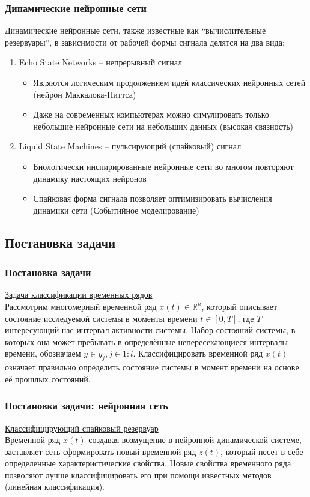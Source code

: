 \documentclass{beamer}
\begin{document}
\begin{frame}
\frametitle{Динамические нейронные сети}
Динамические нейронные сети, также известные как ``вычислительные резервуары'', в зависимости от рабочей формы сигнала делятся на два вида:
\begin{enumerate}
\item Echo State Networks \cite{jaeger} -- непрерывный сигнал\\
\begin{itemize}

\item Являются логическим продолжением идей классических нейронных сетей (нейрон Маккалока-Питтса)
\item Даже на современных компьютерах можно симулировать только небольшие нейронные сети на небольших данных (высокая связность)

\end{itemize}
\item Liquid State Machines \cite{lsm} -- пульсирующий (спайковый) сигнал
\begin{itemize}
\item Биологически инспирированные нейронные сети во многом повторяют динамику настоящих нейронов
\item Спайковая форма сигнала позволяет оптимизировать вычисления динамики сети (Событийное моделирование)
\end{itemize}

\end{enumerate}
\end{frame}
\subsection{Постановка задачи}
\begin{frame}
\frametitle{Постановка задачи}
\uline{Задача классификации временных рядов}\\
Рассмотрим многомерный временной ряд $x(t) \in \mathbb{R}^n$, который описывает состояние исследуемой системы в моменты времени $t \in [0, T]$, где $T$ интересующий нас интервал активности системы. Набор состояний системы, в которых она может пребывать в определённые непересекающиеся интервалы времени, обозначаем $y \in {y_j, j \in 1:l}$. Классифицировать временной ряд $x(t)$ означает правильно определить состояние системы в момент времени  на основе её прошлых состояний.
\end{frame}

\begin{frame}
\frametitle{Постановка задачи: нейронная сеть}
\uline{Классифицирующий спайковый резервуар}\\
Временной ряд $x(t)$ создавая возмущение в нейронной динамической системе, заставляет сеть сформировать новый временной ряд $z(t)$, который несет в себе определенные характеристические свойства. Новые свойства временного ряда позволяют лучше классифицировать его при помощи известных методов (линейная классификация).

\end{frame}
\end{document}

